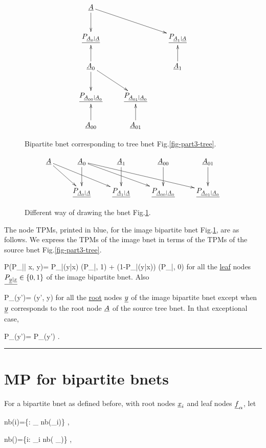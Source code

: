 \begin{figure}[h!]
$$\xymatrix{
\rvA\ar[d]\ar[rrd]
\\
\ul{P_{\rvA_0|\rvA}}&&\ul{P_{\rvA_1|\rvA}}
\\
\rvA_0\ar[u]\ar[d]\ar[rd]&&\rvA_1\ar[u]
\\
\ul{P_{\rvA_{00}|\rvA_0}}&\ul{P_{\rvA_{01}|\rvA_0}}
\\
\rvA_{00}\ar[u]&\rvA_{01}\ar[u]
}
$$
\caption{Bipartite bnet
corresponding
to tree bnet Fig.\ref{fig-part3-tree}.}
\label{fig-part3-tree-junc-tree}
\end{figure}

\begin{figure}[h!]
\centering
$$\xymatrix{
\rvA\ar[dr]\ar[drr]
&\rvA_{0}\ar[d]\ar[drr]\ar[drrr]
&\rvA_{1}\ar[d]
&\rvA_{00}\ar[d]
&\rvA_{01}\ar[d]
\\
&\ul{P_{\rvA_{0}|\rvA}}
&\ul{P_{\rvA_{1}|\rvA}}
&\ul{P_{\rvA_{00}|\rvA_0}}
&\ul{P_{\rvA_{01}|\rvA_0}}
}$$
\caption{
Different
way of drawing 
the bnet Fig.\ref{fig-part3-tree-junc-tree}.}
\label{fig-part3-tree-bip-bnet}
\end{figure}

The node  TPMs, printed in blue,
for the image bipartite bnet 
Fig.\ref{fig-part3-tree-junc-tree},
are as follows. We express the
TPMs of the image bnet
in terms of the 
TPMs of the source bnet 
Fig.\ref{fig-part3-tree}.

\beq\color{blue}
P(P_{\rvy|\rvx}| x, y)=
P_{\rvy|\rvx}(y|x)
\delta(P_{\rvy|\rvx}, 1)
+
(1-P_{\rvy|\rvx}(y|x))
\delta(P_{\rvy|\rvx}, 0)
\eeq
for all the
\ul{leaf} 
nodes $\underline{P_{{\underline{y}}|{\underline{x}}}}\in \{0,1\}$ of the
image bipartite bnet.
Also

\beq\color{blue}
P_\rvy(y')= \delta(y', y)
\;
\eeq
for all the \ul{root} nodes ${\underline{y}}$ of the
image bipartite bnet
except when 
${\underline{y}}$ corresponds to
the root node ${\underline{A}}$
of the source tree bnet.
In that exceptional case,

\beq\color{blue}
P_\rvy(y')= P_\rvA(y')
\;.
\eeq


\hrule


\section*{MP for
bipartite bnets}
For
a bipartite 
bnet as defined before,
with
root nodes ${\underline{x}}_i$
and leaf nodes ${\underline{f}}_\alpha$,
let


\beq
nb(i)=\{\alp: \rvf_\alpha\in
nb(\rvx_i)\}
\;,
\eeq

\beq
nb(\alpha)=\{i: \rvx_i\in
nb( \rvf_\alpha)\}
\;,
\eeq

